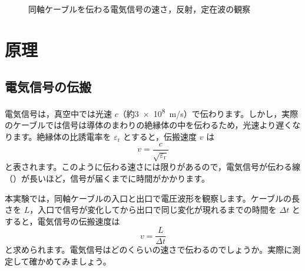 \begin{figure}[htbp]
  \caption{同軸ケーブルを伝わる電気信号の速さ，反射，定在波の観察}
  \label{fig:voltagewave-overview}
\end{figure}

\section{原理}

\subsection{電気信号の伝搬}

電気信号は，真空中では光速 $c$（約\SI{3e8}{m/s}）で伝わります。しかし，実際のケーブルでは信号は導体のまわりの絶縁体の中を伝わるため，光速より遅くなります。絶縁体の比誘電率を $\varepsilon_\mathrm{r}$ とすると，伝搬速度 $v$ は
\begin{equation}
  v = \frac{c}{\sqrt{\varepsilon_\mathrm{r}}}
  \label{eq:voltagewave-velocity}
\end{equation}
と表されます。このように伝わる速さには限りがあるので，電気信号が伝わる線（）が長いほど，信号が届くまでに時間がかかります。

本実験では，同軸ケーブルの入口と出口で電圧波形を観察します。ケーブルの長さを $L$，入口で信号が変化してから出口で同じ変化が現れるまでの時間を $\Delta t$ とすると，電気信号の伝搬速度は
\begin{equation}
  v = \frac{L}{\Delta t}
  \label{eq:voltagewave-measure}
\end{equation}
と求められます。電気信号はどのくらいの速さで伝わるのでしょうか。実際に測定して確かめてみましょう。

